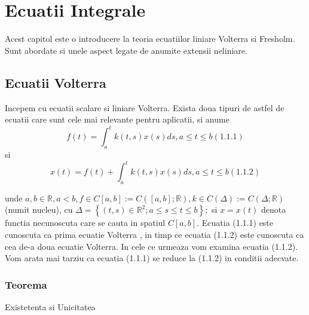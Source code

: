 \documentclass[a4paper,12pt,oneside]{report}
\begin{document}
\maketitle

\tableofcontents

%
%
%
%
\chapter{Ecuatii Integrale}

Acest capitol este o introducere la teoria ecuatiilor liniare Volterra si Fresholm. Sunt abordate si unele aspect legate de anumite extensii neliniare.

\section{Ecuatii Volterra}

Incepem cu ecuatii scalare si liniare Volterra. Exista doua tipuri de astfel de ecuatii care sunt cele mai relevante pentru aplicatii, si anume
\begin{displaymath}
	f\left ( t \right ) = \int_{a}^{t}k\left ( t,s \right )x\left ( s \right )ds,    a\leq t\leq b (1.1.1)
\end{displaymath}
si 
\begin{displaymath}
	x\left ( t \right ) = f\left ( t \right ) + \int_{a}^{t}k\left ( t,s \right )x\left ( s \right )ds, a\leq t\leq b (1.1.2)
\end{displaymath}

unde \(a,b \in \mathbb{R}, a< b, f\in C\left [ a,b \right ]:= C\left ( \left [ a,b \right ];\mathbb{R} \right ) , k\in C\left (\Delta   \right ):= C\left ( \Delta ;\mathbb{R} \right )\) (numit nucleu), cu \(\Delta =\left \{ \left ( t,s \right )\in \mathbb{R}^{2};a\leq s\leq t\leq b \right \};\) si \(x=x\left ( t \right )\) denota functia necunoscuta care se cauta in spatiul \(C\left [ a,b \right ]\). 
Ecuatia (1.1.1) este cunoscuta ca prima ecuatie Volterra , in timp ce ecuatia (1.1.2) este cunoscuta ca cea de-a doua ecuatie Volterra. In cele ce urmeaza vom examina ecuatia (1.1.2). Vom arata mai tarziu ca ecuatia (1.1.1) se reduce la (1.1.2) in conditii adecvate. 

\subsection{Teorema}

Existetenta si Unicitatea
\end{document}
